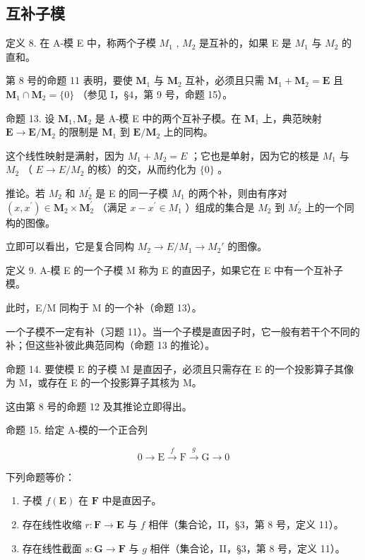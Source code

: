 \subsection{互补子模}

定义 8. 在 A-模 E 中，称两个子模 \(M_{1}\) , \(M_{2}\) 是互补的，如果 E 是 \(M_{1}\) 与 \(M_{2}\) 的直和。

第 8 号的命题 11 表明，要使 \(\mathbf{M}_1\) 与 \(\mathbf{M}_2\) 互补，必须且只需 \(\mathbf{M}_1 + \mathbf{M}_2 = \mathbf{E}\) 且 \(\mathbf{M}_1 \cap \mathbf{M}_2 = \{0\}\) （参见 I，§4，第 9 号，命题 15）。

命题 13. 设 \(\mathbf{M}_1, \mathbf{M}_2\) 是 A-模 E 中的两个互补子模。在 \(\mathbf{M}_1\) 上，典范映射 \(\mathbf{E} \to \mathbf{E} / \mathbf{M}_2\) 的限制是 \(\mathbf{M}_1\) 到 \(\mathbf{E} / \mathbf{M}_2\) 上的同构。

这个线性映射是满射，因为 \(M_{1} + M_{2} = E\) ；它也是单射，因为它的核是 \(M_{1}\) 与 \(M_{2}\) （ \(E \rightarrow E/M_{2}\) 的核）的交，从而约化为 \(\{0\}\) 。

推论。若 \(M_{2}\) 和 \(M_{2}^{\prime}\) 是 E 的同一子模 \(M_{1}\) 的两个补，则由有序对 \((x, x^{\prime}) \in \mathbf{M}_{2} \times \mathbf{M}_{2}^{\prime}\) （满足 \(x - x^{\prime} \in M_{1}\) ）组成的集合是 \(M_{2}\) 到 \(M_{2}^{\prime}\) 上的一个同构的图像。

立即可以看出，它是复合同构 \(M_{2} \rightarrow E/M_{1} \rightarrow M_{2}'\) 的图像。

定义 9. A-模 E 的一个子模 M 称为 E 的直因子，如果它在 E 中有一个互补子模。

此时，E/M 同构于 M 的一个补（命题 13）。

一个子模不一定有补（习题 11）。当一个子模是直因子时，它一般有若干个不同的补；但这些补彼此典范同构（命题 13 的推论）。

命题 14. 要使模 E 的子模 M 是直因子，必须且只需存在 E 的一个投影算子其像为 M，或存在 E 的一个投影算子其核为 M。

这由第 8 号的命题 12 及其推论立即得出。

命题 15. 给定 A-模的一个正合列

\[
0 \longrightarrow \mathrm{E} \stackrel {f} {\longrightarrow} \mathrm{F} \stackrel {g} {\longrightarrow} \mathrm{G} \longrightarrow 0\tag{33}
\]

下列命题等价：

\begin{enumerate}
\def\labelenumi{(\alph{enumi})}
\item
  子模 \(f(\mathbf{E})\) 在 \(\mathbf{F}\) 中是直因子。
\item
  存在线性收缩 \(r: \mathbf{F} \to \mathbf{E}\) 与 \(f\) 相伴（集合论，II，§3，第 8 号，定义 11）。
\item
  存在线性截面 \(s: \mathbf{G} \to \mathbf{F}\) 与 \(g\) 相伴（集合论，II，§3，第 8 号，定义 11）。
\end{enumerate}

